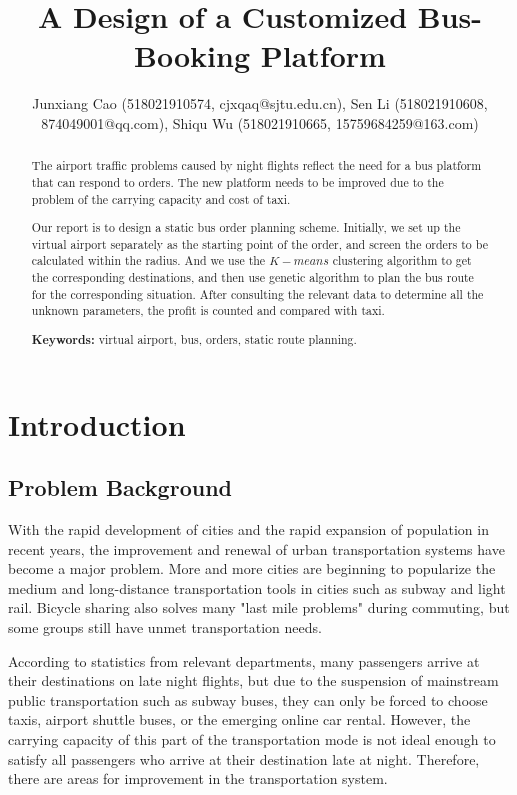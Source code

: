 \documentclass{llncs}
\title{A Design of a Customized Bus-Booking Platform}
\author{Junxiang Cao (518021910574, cjxqaq@sjtu.edu.cn), Sen Li (518021910608, 874049001@qq.com), Shiqu Wu (518021910665, 15759684259@163.com)}
\institute{Department of Computer Science, \\ Shanghai Jiao Tong University, Shanghai, China}
\begin{document}



\maketitle
\begin{abstract}\vspace{-5mm}
The airport traffic problems caused by night flights reflect the need for a bus platform that can respond to orders. The new platform needs to be improved due to the problem of the carrying capacity and cost of taxi.

Our report is to design a static bus order planning scheme. Initially, we set up the virtual airport separately as the starting point of the order, and screen the orders to be calculated within the radius. And we use the $K-means$ clustering algorithm to get the corresponding destinations, and then use genetic algorithm to plan the bus route for the corresponding situation. After consulting the relevant data to determine all the unknown parameters, the profit is counted and compared with taxi.


\textbf{Keywords:} virtual airport, bus, orders, static route planning.
\end{abstract}

\section{Introduction}
\subsection{Problem Background}
With the rapid development of cities and the rapid expansion of population in recent years, the improvement and renewal of urban transportation systems have become a major problem. More and more cities are beginning to popularize the medium and long-distance transportation tools in cities such as subway and light rail. Bicycle sharing also solves many "last mile problems" during commuting, but some groups still have unmet transportation needs.

According to statistics from relevant departments, many passengers arrive at their destinations on late night flights, but due to the suspension of mainstream public transportation such as subway buses, they can only be forced to choose taxis, airport shuttle buses, or the emerging online car rental. However, the carrying capacity of this part of the transportation mode is not ideal enough to satisfy all passengers who arrive at their destination late at night. Therefore, there are areas for improvement in the transportation system.
\end{document}
